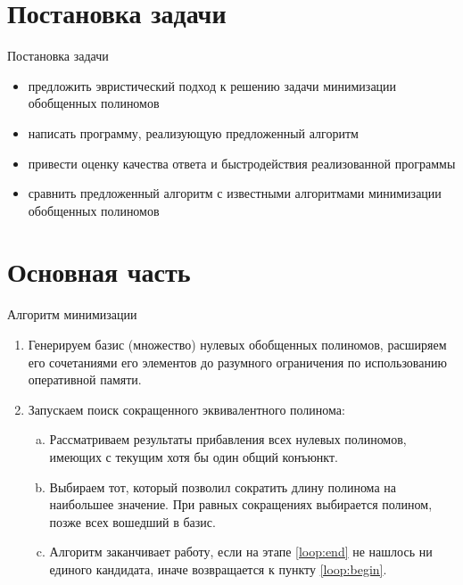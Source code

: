 \documentclass{beamer}
\begin{document}
\section{Постановка задачи}
\begin{frame}{Постановка задачи}

\begin{itemize}
    \item предложить эвристический подход к решению задачи минимизации обобщенных полиномов
    \item написать программу, реализующую предложенный алгоритм
    \item привести оценку качества ответа и быстродействия реализованной программы
    \item сравнить предложенный алгоритм с известными алгоритмами минимизации обобщенных полиномов
\end{itemize}

\end{frame}

\section{Основная часть}

\begin{frame}{Алгоритм минимизации}

\begin{enumerate}
    \item Генерируем базис (множество) нулевых обобщенных полиномов, расширяем его сочетаниями его элементов до разумного ограничения по использованию оперативной памяти.
    \item Запускаем поиск сокращенного эквивалентного полинома:
    \begin{enumerate}[a.]
        \item \label{loop:begin} Рассматриваем результаты прибавления всех нулевых полиномов, имеющих с текущим хотя бы один общий конъюнкт.
        \item \label{loop:end} Выбираем тот, который позволил сократить длину полинома на наибольшее значение. При равных сокращениях выбирается полином, позже всех вошедший в базис.
        \item Алгоритм заканчивает работу, если на этапе \ref{loop:end} не нашлось ни единого кандидата, иначе возвращается к пункту \ref{loop:begin}.
    \end{enumerate}
\end{enumerate}

\end{frame}
\end{document}
